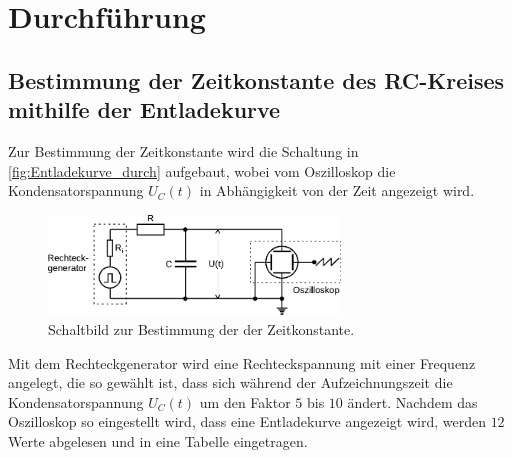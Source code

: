 \section{Durchführung}
\label{sec:Durchführung}

\subsection{Bestimmung der Zeitkonstante des RC-Kreises mithilfe der Entladekurve} %
\label{sub:Entladekurve_durch}
Zur Bestimmung der Zeitkonstante wird die Schaltung in \autoref{fig:Entladekurve_durch} aufgebaut,
wobei vom Oszilloskop die Kondensatorspannung $U_C(t)$ in Abhängigkeit von der Zeit angezeigt wird.
\begin{figure}[H]
    \centering
    \includegraphics[width=0.69\textwidth]{build/Abb_3.pdf}
    \caption{Schaltbild zur Bestimmung der der Zeitkonstante.\cite{V353}}
    \label{fig:Entladekurve_durch}
\end{figure}
\noindent Mit dem Rechteckgenerator wird eine Rechteckspannung mit einer Frequenz angelegt, die so gewählt ist, dass sich während der Aufzeichnungszeit die Kondensatorspannung $U_C(t)$ um den Faktor $5$ bis $10$ ändert.
Nachdem das Oszilloskop so eingestellt wird, dass eine Entladekurve angezeigt wird, werden $12$ Werte abgelesen und in eine Tabelle eingetragen. 
